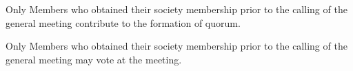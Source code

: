 \begin{clause}
    Only Members who obtained their society membership prior to the calling of the general meeting contribute to the formation of quorum.
\end{clause}

\begin{clause}
    Only Members who obtained their society membership prior to the calling of the general meeting may vote at the meeting.
\end{clause}
